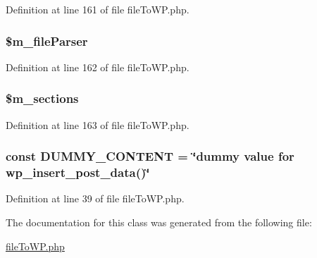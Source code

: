 Definition at line 161 of file file\+To\+W\+P.\+php.

\hypertarget{class_c_file_to_w_p_a67150998a8e2738b8e5c4e8c160c6aea}{
\subsubsection[{\$m\+\_\+file\+Parser}]{\setlength{\rightskip}{0pt plus 5cm}\$m\+\_\+file\+Parser\hspace{0.3cm}{\ttfamily [private]}}}\label{class_c_file_to_w_p_a67150998a8e2738b8e5c4e8c160c6aea}


Definition at line 162 of file file\+To\+W\+P.\+php.

\hypertarget{class_c_file_to_w_p_a24156332f65e1ccec8b6e489b1508d39}{
\subsubsection[{\$m\+\_\+sections}]{\setlength{\rightskip}{0pt plus 5cm}\$m\+\_\+sections\hspace{0.3cm}{\ttfamily [private]}}}\label{class_c_file_to_w_p_a24156332f65e1ccec8b6e489b1508d39}


Definition at line 163 of file file\+To\+W\+P.\+php.

\hypertarget{class_c_file_to_w_p_a2cbf943c3c9c6f48e6c6595c660a5985}{
\subsubsection[{D\+U\+M\+M\+Y\+\_\+\+C\+O\+N\+T\+E\+N\+T}]{\setlength{\rightskip}{0pt plus 5cm}const D\+U\+M\+M\+Y\+\_\+\+C\+O\+N\+T\+E\+N\+T = \char`\"{}dummy value for wp\+\_\+insert\+\_\+post\+\_\+data()\char`\"{}}}\label{class_c_file_to_w_p_a2cbf943c3c9c6f48e6c6595c660a5985}


Definition at line 39 of file file\+To\+W\+P.\+php.



The documentation for this class was generated from the following file\+:\begin{DoxyCompactItemize}
\item 
\hyperlink{file_to_w_p_8php}{file\+To\+W\+P.\+php}\end{DoxyCompactItemize}
